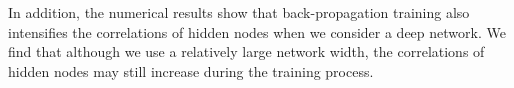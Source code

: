 In addition, the numerical results show that back-propagation training also intensifies the correlations of hidden nodes when we consider a deep network.
We find that although we use a relatively large network width, the correlations of hidden nodes may still increase during the training process.






